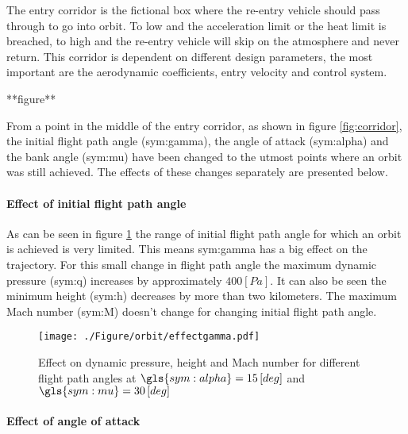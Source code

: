 The entry corridor is the fictional box where the re-entry vehicle should pass through to go into orbit. To low and the acceleration limit or the heat limit is breached, to high and the re-entry vehicle will skip on the atmosphere and never return. This corridor is dependent on different design parameters, the most important are the aerodynamic coefficients, entry velocity and control system.

**figure**

From a point in the middle of the entry corridor, as shown in figure \ref{fig:corridor}, the initial flight path angle (\gls{sym:gamma}), the angle of attack (\gls{sym:alpha}) and the bank angle (\gls{sym:mu}) have been changed to the utmost points where an orbit was still achieved. The effects of these changes separately are presented below.

\paragraph{Effect of initial flight path angle}

As can be seen in figure \ref{fig:effectgamma} the range of initial flight path angle for which an orbit is achieved is very limited. This means \gls{sym:gamma} has a big effect on the trajectory. For this small change in flight path angle the maximum dynamic pressure (\gls{sym:q}) increases by approximately $400 \left[Pa\right]$. It can also be seen the minimum height (\gls{sym:h}) decreases by more than two kilometers. The maximum Mach number (\gls{sym:M}) doesn't change for changing initial flight path angle.
\begin{figure}[H]
	\centering
	\texttt{[image: ./Figure/orbit/effectgamma.pdf]}
	\caption{Effect on dynamic pressure, height and Mach number for different flight path angles at $\gls{sym:alpha}=15 \left[deg\right]$ and $\gls{sym:mu}=30 \left[deg\right]$}
	\label{fig:effectgamma}
\end{figure}

\paragraph{Effect of angle of attack}

